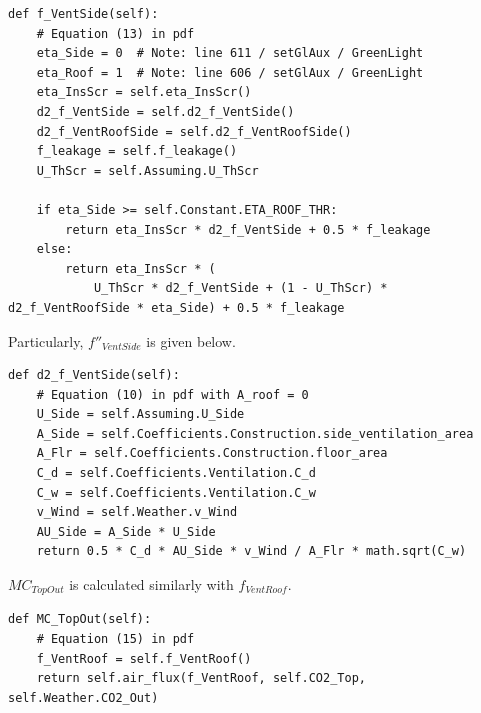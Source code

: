 \documentclass[a4paper]{article}
\begin{document}
\begin{mdframed}[leftline=false,rightline=false,backgroundcolor=magenta!10,nobreak=true]
  \begin{verbatim}
def f_VentSide(self):
    # Equation (13) in pdf
    eta_Side = 0  # Note: line 611 / setGlAux / GreenLight
    eta_Roof = 1  # Note: line 606 / setGlAux / GreenLight
    eta_InsScr = self.eta_InsScr()
    d2_f_VentSide = self.d2_f_VentSide()
    d2_f_VentRoofSide = self.d2_f_VentRoofSide()
    f_leakage = self.f_leakage()
    U_ThScr = self.Assuming.U_ThScr

    if eta_Side >= self.Constant.ETA_ROOF_THR:
        return eta_InsScr * d2_f_VentSide + 0.5 * f_leakage
    else:
        return eta_InsScr * (
            U_ThScr * d2_f_VentSide + (1 - U_ThScr) * d2_f_VentRoofSide * eta_Side) + 0.5 * f_leakage
  \end{verbatim}
\end{mdframed}

Particularly, \(f''_{VentSide}\) is given below.
\begin{mdframed}[leftline=false,rightline=false,backgroundcolor=magenta!10,nobreak=true]
  \begin{verbatim}
def d2_f_VentSide(self):
    # Equation (10) in pdf with A_roof = 0
    U_Side = self.Assuming.U_Side
    A_Side = self.Coefficients.Construction.side_ventilation_area
    A_Flr = self.Coefficients.Construction.floor_area
    C_d = self.Coefficients.Ventilation.C_d
    C_w = self.Coefficients.Ventilation.C_w
    v_Wind = self.Weather.v_Wind
    AU_Side = A_Side * U_Side
    return 0.5 * C_d * AU_Side * v_Wind / A_Flr * math.sqrt(C_w)
  \end{verbatim}
\end{mdframed}

\(MC_{TopOut}\) is calculated similarly with \(f_{VentRoof}\).
\begin{mdframed}[leftline=false,rightline=false,backgroundcolor=magenta!10,nobreak=true]
  \begin{verbatim}
def MC_TopOut(self):
    # Equation (15) in pdf
    f_VentRoof = self.f_VentRoof()
    return self.air_flux(f_VentRoof, self.CO2_Top, self.Weather.CO2_Out)
  \end{verbatim}
\end{mdframed}
\end{document}

